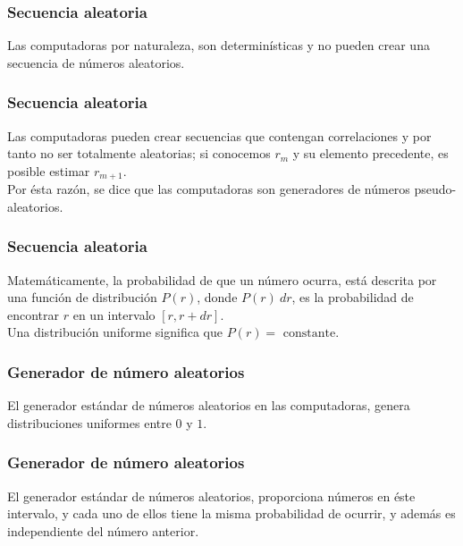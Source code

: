 \documentclass[12pt]{beamer}
\begin{document}
\begin{frame}
\frametitle{Secuencia aleatoria}
Las computadoras por naturaleza, son determinísticas y no pueden crear una secuencia de números aleatorios.
\end{frame}
\begin{frame}
\frametitle{Secuencia aleatoria}
Las computadoras pueden crear secuencias que contengan correlaciones y por tanto no ser totalmente aleatorias; si conocemos $r_{m}$ y su elemento precedente, es posible estimar $r_{m+1}$.
\\
\bigskip
\pause
Por ésta razón, se dice que las computadoras son generadores de números pseudo-aleatorios.
\end{frame}
\begin{frame}
\frametitle{Secuencia aleatoria}
Matemáticamente, la probabilidad de que un número ocurra, está descrita por una función de distribución $P(r)$, donde $P(r) \: dr$, es la probabilidad de encontrar $r$ en un intervalo $[r, r + dr]$.
\\
\bigskip
\pause
Una distribución uniforme significa que $P(r) = \mbox{ constante}$.
\end{frame}
\begin{frame}
\frametitle{Generador de número aleatorios}
El generador estándar de números aleatorios en las computadoras, genera distribuciones uniformes entre $0$ y $1$.
\end{frame}
\begin{frame}
\frametitle{Generador de número aleatorios}
El generador estándar de números aleatorios, proporciona números en éste intervalo, y cada uno de ellos tiene la misma probabilidad de ocurrir, y además es independiente del número anterior.
\end{frame}
\end{document}
